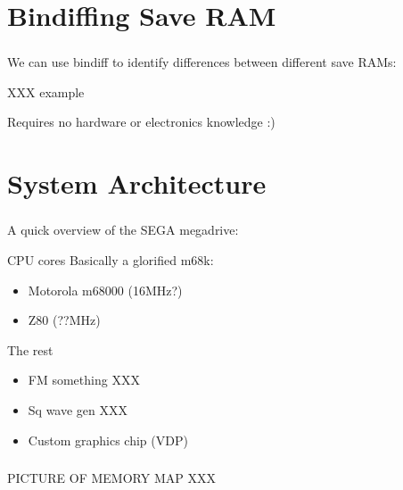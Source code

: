 \documentclass{beamer}
\begin{document}

\section{Bindiffing Save RAM}

\begin{frame}[fragile]
\frametitle{\insertsection}

We can use bindiff to identify differences between different save RAMs:

XXX example

\vfill

Requires no hardware or electronics knowledge :)

\end{frame}


\section{System Architecture}

\begin{frame}[fragile]
\frametitle{\insertsection}

A quick overview of the SEGA megadrive:

\begin{block}{CPU cores}
Basically a glorified m68k:

\begin{itemize}
\item Motorola m68000 (16MHz?)
\item Z80 (??MHz)
\end{itemize}
\end{block}

\vfill

\begin{block}{The rest}
\begin{itemize}
\item FM something XXX
\item Sq wave gen XXX
\item Custom graphics chip (VDP)
\end{itemize}
\end{block}

\end{frame}


\begin{frame}[fragile]
\frametitle{\insertsection}


PICTURE OF MEMORY MAP XXX 

\end{frame}
\end{document}
